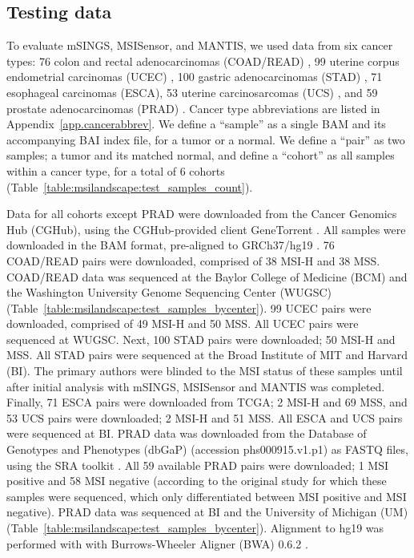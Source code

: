 \subsection{Testing data}
\label{ssec:msilandscape:testing_data}
To evaluate mSINGS, MSISensor, and MANTIS, we used data from six cancer types: 76 colon and rectal adenocarcinomas (COAD/READ) \cite{tcgacoadread}, 99 uterine corpus endometrial carcinomas (UCEC) \cite{tcgaucec}, 100 gastric adenocarcinomas (STAD) \cite{tcgastad}, 71 esophageal carcinomas (ESCA), 53 uterine carcinosarcomas (UCS) \cite{tcgageneric}, and 59 prostate adenocarcinomas (PRAD) \cite{robinson2015}. Cancer type abbreviations are listed in Appendix~\ref{app.cancerabbrev}. We define a ``sample'' as a single BAM and its accompanying BAI index file, for a tumor or a normal. We define a ``pair'' as two samples; a tumor and its matched normal, and define a ``cohort'' as all samples within a cancer type, for a total of 6 cohorts (Table~\ref{table:msilandscape:test_samples_count}).

Data for all cohorts except PRAD were downloaded from the Cancer Genomics Hub (CGHub), using the CGHub-provided client GeneTorrent \cite{wilks2014}. All samples were downloaded in the BAM format, pre-aligned to GRCh37/hg19 \cite{lander2001}. 76 COAD/READ pairs were downloaded, comprised of 38 MSI-H and 38 MSS\@. COAD/READ data was sequenced at the Baylor College of Medicine (BCM) and the Washington University Genome Sequencing Center (WUGSC) (Table~\ref{table:msilandscape:test_samples_bycenter}). 99 UCEC pairs were downloaded, comprised of 49 MSI-H and 50 MSS\@. All UCEC pairs were sequenced at WUGSC\@. Next, 100 STAD pairs were downloaded; 50 MSI-H and MSS\@. All STAD pairs were sequenced at the Broad Institute of MIT and Harvard (BI)\@. The primary authors were blinded to the MSI status of these samples until after initial analysis with mSINGS, MSISensor and MANTIS was completed. Finally, 71 ESCA pairs were downloaded from TCGA; 2 MSI-H and 69 MSS, and 53 UCS pairs were downloaded; 2 MSI-H and 51 MSS\@. All ESCA and UCS pairs were sequenced at BI\@. PRAD data was downloaded from the Database of Genotypes and Phenotypes (dbGaP) (accession phs000915.v1.p1) \cite{mailman2007} as FASTQ files, using the SRA toolkit \cite{leinonen2010sra}. All 59 available PRAD pairs were downloaded; 1 MSI positive and 58 MSI negative (according to the original study for which these samples were sequenced, which only differentiated between MSI positive and MSI negative). PRAD data was sequenced at BI and the University of Michigan (UM) (Table~\ref{table:msilandscape:test_samples_bycenter}). Alignment to hg19 was performed with with Burrows-Wheeler Aligner (BWA) 0.6.2 \cite{bwa}.

